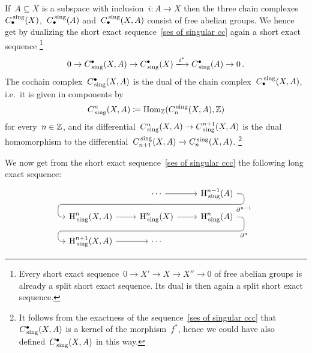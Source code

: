 \begin{example}
\begin{enumerate}
      If~$A \subseteq X$ is a subspace with inclusion~$i \colon A \to X$ then the three chain complexes~$C_\bullet^{\,\mathrm{sing}}(X)$,~$C_\bullet^{\,\mathrm{sing}}(A)$ and~$C_\bullet^{\,\mathrm{sing}}(X,A)$ consist of free abelian groups.
      We hence get by dualizing the short exact sequence~\eqref{ses of singular cc} again a short exact sequence%
      \footnote{Every short exact sequence~$0 \to X' \to X \to X'' \to 0$ of free abelian groups is already a split short exact sequence.
      Its dual is then again a split short exact sequence.}
      \begin{equation}
        \label{ses of singular ccc}
        0
        \to
        \Cccc_\sing(X,A)
        \to
        \Cccc_\sing(X)
        \xlongto{i^*}
        \Cccc_\sing(A)
        \to
        0 \,.
      \end{equation}
      The cochain complex~$C^\bullet_{\,\mathrm{sing}}(X,A)$ is the dual of the chain complex~$C_\bullet^{\,\mathrm{sing}}(X,A)$, i.e.\ it is given in components by
      \[
                  C^n_{\,\mathrm{sing}}(X,A)
        \coloneqq  \operatorname{Hom}_{\mathbb{Z}}(C_n^{\,\mathrm{sing}}(X,A), \mathbb{Z})
      \]
      for every~$n \in \mathbb{Z}$, and its differential~$C^n_{\,\mathrm{sing}}(X,A) \to C^{n+1}_{\,\mathrm{sing}}(X,A)$ is the dual homomorphism to the differential~$C_{n+1}^{\,\mathrm{sing}}(X,A) \to C_n^{\,\mathrm{sing}}(X,A)$.%
      \footnote{It follows from the exactness of the sequence~\eqref{ses of singular ccc} that~$C^\bullet_{\,\mathrm{sing}}(X,A)$ is a kernel of the morphism~$f^*$, hence we could have also defined~$C^\bullet_{\,\mathrm{sing}}(X,A)$ in this way.}
      
      We now get from the short exact sequence~\eqref{ses of singular ccc} the following long exact sequence:
      \[
        \begin{tikzcd}[row sep = small]
            {}
          & \dotsb
            \arrow{r}
            \arrow[d, phantom, ""{coordinate, name=Y}]
          & \Hl^{n-1}_\sing(A)
            \arrow[ dll,
                    "\del^{n-1}",
                    rounded corners,
                    to path={ -- ([xshift=2ex]\tikztostart.east)
                              |- (Y) \tikztonodes
                              -| ([xshift=-2ex]\tikztotarget.west)
                              -- (\tikztotarget)}
                  ]
          \\
            \Hl^n_\sing(X,A)
            \arrow{r}
          & \Hl^n_\sing(X)
            \arrow{r}
            \arrow[d, phantom, ""{coordinate, name=Z}]
          & \Hl^n_\sing(A)
            \arrow[ dll,
                    "\del^n",
                    rounded corners,
                    to path={ -- ([xshift=2ex]\tikztostart.east)
                              |- (Z) \tikztonodes
                              -| ([xshift=-2ex]\tikztotarget.west)
                              -- (\tikztotarget)}
                  ]
          \\
            \Hl^{n+1}_\sing(X,A)
            \arrow{r}
          & \dotsb
          & {}
        \end{tikzcd}
      \]
  \end{enumerate}
\end{example}




